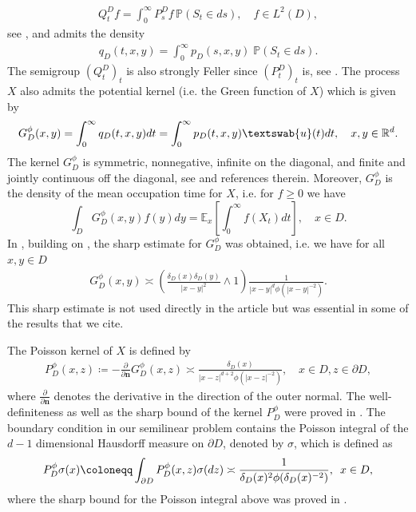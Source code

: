 \documentclass[12pt,a4paper,onecolumn]{amsart}
\theoremstyle{definition}
\newcommand{\R}{\mathbb{R}}
\newcommand{\p}{\mathbb{P}}
\newcommand{\ex}{\mathbb{E}}
\newcommand{\1}{\mathbf 1}
\newcommand{\GDfi}{G^\phi_{ D}}
\newcommand{\GDFI}{\GDfi}
\newcommand{\PDfi}{P^\phi_{ D}}
\newcommand{\PDFI}{\PDfi}
\newcommand{\de}{\delta_D}
\newcommand{\uu}{\textswab{u}}
\numberwithin{equation}{section}
\begin{document}
\begin{align*}
	Q_t^D f=\int_0^\infty P_s^Df \,\p(S_t\in ds),\quad f\in L^2(D),
\end{align*}
see \cite[Proposition 13.1]{bernstein}, and admits the density 
\begin{align*}
	q_D(t,x,y)=\int_0^\infty p_D(s,x,y)\;\p(S_t\in ds).
\end{align*}
The semigroup $(Q_t^D)_t$ is also strongly Feller since $(P_t^D)_t$ is, see \cite[Proposition V.3.3]{bliedtner}.
The process $X$ also admits the potential kernel (i.e. the Green function of $X$) which is given by
\begin{align*}
	\GDfi(x,y)=\int_0^\infty q_D(t,x,y)dt=\int_0^\infty p_D(t,x,y)\uu(t)dt,\quad x,y\in\R^d.
\end{align*}
The kernel $\GDFI$ is symmetric, nonnegative, infinite on the diagonal, and finite and jointly continuous off the diagonal, see \cite[p. 857]{Bio23} and references therein. Moreover, $\GDFI$ is the density of the mean occupation time for $X$, i.e. for $f\ge0$ we have
$$ \int_D \GDFI(x,y)f(y)dy=\ex_x\left[\int_0^\infty f(X_t)dt\right], \quad x\in D.$$
In \cite[Lemma A.1]{Bio23}, building on \cite[Theorem 3.1]{ksv_minimal2016}, the sharp estimate for $\GDFI$ was obtained, i.e. we have for all $x,y\in D$
\begin{align}\label{eq:Green function sharp estimate}
	\GDfi(x,y)\asymp \left(\frac{\de(x)\de(y)}{|x-y|^{2}}\wedge 1\right)\frac{1}{|x-y|^{d}\phi(|x-y|^{-2})}.
\end{align}
This sharp estimate is not used directly in the article but was essential in some of the results that we cite.


The Poisson kernel of $X$ is defined by
\begin{align*}
		\PDfi(x,z)\coloneqq -\frac{\partial}{\partial {\mathbf{n}}}\GDfi(x,z)\asymp \frac{\de(x)}{|x-z|^{d+2}\phi(|x-z|^{-2})},\quad x\in D,z\in\partial D,
\end{align*}
where $\frac{\partial}{\partial \mathbf{n}}$ denotes the derivative in the direction of the outer normal. The well-definiteness as well as the sharp bound of the kernel $\PDFI$ were proved in \cite[Proposition 2.19]{Bio23}. The boundary condition in our semilinear problem contains the Poisson integral of the $d-1$ dimensional Hausdorff measure on $\partial D$, denoted by $\sigma$, which is defined as
\begin{align}\label{eq:PDFI_sigma}
     \PDFI\sigma(x)\coloneqq \int_{\partial D}\PDFI(x,z)\sigma(dz)\asymp \frac{1}{\de(x)^2\phi(\de(x)^{-2})},\enskip x\in D,
\end{align}
where the sharp bound for the Poisson integral above was proved in  \cite[Lemma 3.1]{Bio23}.
\end{document}
